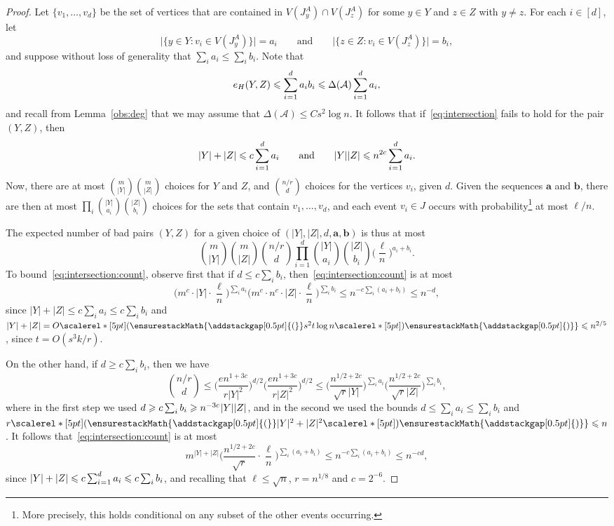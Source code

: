 \documentclass[12pt,reqno]{amsart}
\newcommand\pig[1]{\scalerel*[5pt]{\normalsize#1}{%
  \ensurestackMath{\addstackgap[0.5pt]{\normalsize#1}}}}
\theoremstyle{remark}
\numberwithin{theorem}{section}
\renewcommand{\(}{\bigl(}
\renewcommand{\)}{\bigr)\vphantom{)}}
\newcommand{\gap}{\hspace{0.02cm}}
\newcommand{\eqa}{\hspace{0.02cm}=\hspace{0.015cm}}
\newcommand{\cA}{\mathcal A}
\renewcommand{\le}{\leqslant}
\renewcommand{\ge}{\geqslant}
\def\va{\mathbf{a}}
\def\vb{\mathbf{b}}
\begin{document}
\begin{proof}
Let $\{v_1,\ldots,v_d\}$ be the set of vertices that are contained in $V(J_y^A) \cap V(J_z^A)$ for some $y \in Y$ and $z \in Z$ with $y \ne z$. For each $i \in [d]$, let
\begin{equation}\label{def:ai:bi}
\big|\big\{ y \in Y  : v_i \in V(J_y^A) \big\} \big| = a_i \qquad \text{and} \qquad \big|\big\{ z \in Z : v_i \in V(J_z^A) \big\} \big| = b_i,
\end{equation}
and suppose without loss of generality that $\sum_i a_i \le \sum_i b_i$. Note that
$$e_H(Y,Z) \le \sum_{i \eqa 1}^d a_i b_i \le \Delta(\cA) \sum_{i \eqa 1}^d a_i,$$
and recall from Lemma~\ref{obs:deg} that we may assume that $\Delta(\cA) \le C s^2 \log n$. It follows that if~\eqref{eq:intersection} fails to hold for the pair $(Y,Z)$, then
$$|Y| + |Z| \le c \sum_{i \eqa 1}^d a_i \qquad \text{and} \qquad |Y| |Z| \le n^{2c} \sum_{i \eqa 1}^d a_i.$$
Now, there are at most ${m \choose |Y|} {m \choose |Z|}$ choices for $Y$ and $Z$, and ${n/r \choose d}$ choices for the vertices $v_i$, given $d$. Given the sequences $\va$ and $\vb$, there are then at most $\prod_i {|Y| \choose a_i} {|Z| \choose b_i}$ choices for the sets that contain $v_1,\ldots,v_d$, and each event $v_i \in J$ occurs with probability\footnote{More precisely, this holds conditional on any subset of the other events occurring.} at most $\ell/n$. 

The expected number of bad pairs $(Y,Z)$ for a given choice of $(|Y|,|Z|,d,\va,\vb)$ is thus at most
\begin{equation}\label{eq:intersection:count}
{m \choose |Y|} {m \choose |Z|} {n/r \choose d} \prod_{i = 1}^d {|Y| \choose a_i} {|Z| \choose b_i} \bigg( \frac{\ell}{n} \bigg)^{a_i + b_i}. 
\end{equation}
To bound~\eqref{eq:intersection:count}, observe first that if $d \le c \sum_i b_i$, then~\eqref{eq:intersection:count} is at most
$$\bigg( m^c \cdot |Y| \cdot \frac{\ell}{n} \bigg)^{\sum_i a_i} \bigg( m^c \cdot n^c \cdot |Z| \cdot \frac{\ell}{n} \bigg)^{\sum_i b_i} \le n^{-c \sum_i (a_i + b_i)} \le n^{-d},$$
since $|Y| + |Z| \le c \sum_i a_i \le c \sum_i b_i$ and $|Y| + |Z| = O\pig( s^2 t \log n \pig) \le n^{2/5}$, since $t = O(s^3k/r)$. 

On the other hand, if $d \ge c \sum_i b_i$, then we have
$${n/r \choose d} \le \bigg( \frac{e n^{1+3c}}{r|Y|^2} \bigg)^{d/2} \bigg( \frac{e n^{1+3c}}{r|Z|^2} \bigg)^{d/2} \le \bigg( \frac{n^{1/2+2c}}{\sqrt{r} |Y|} \bigg)^{\sum_i a_i} \bigg( \frac{n^{1/2+2c}}{\sqrt{r} |Z|} \bigg)^{\sum_i b_i},$$
where in the first step we used $d \ge c \sum_i b_i \ge n^{-3c} \gap |Y||Z|$, and in the second we used the bounds $d \le \sum_i a_i \le \sum_i b_i$ and $r \pig( |Y|^2 + |Z|^2 \pig) \le n$. It follows that~\eqref{eq:intersection:count} is at most
$$m^{|Y|+|Z|} \bigg( \frac{n^{1/2+2c}}{\sqrt{r}} \cdot \frac{\ell}{n} \bigg)^{\sum_i (a_i + b_i)} \le n^{-c \sum_i (a_i + b_i)} \le n^{-cd},$$
since $|Y| + |Z| \le c \sum_{i \eqa 1}^d a_i \le c \sum_i b_i$, and recalling that $\ell \le \sqrt{n}$, $r = n^{1/8}$ and $c = 2^{-6}$. 


\end{proof}
\end{document}
